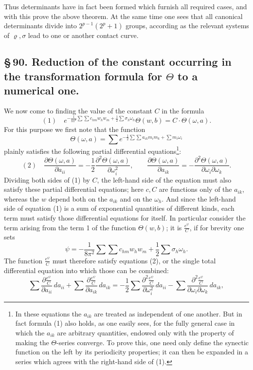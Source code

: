 \documentclass[10pt]{article}
\begin{document}
Thus determinants have in fact been formed which furnish all required cases, and with this prove the above theorem. At the same time one sees that all canonical determinants divide into \(2^{p-1}(2^p+1)\) groups, according as the relevant systems of \(\varrho,\sigma\) lead to one or another contact curve.

\subsection*{\S\,90. Reduction of the constant occurring in the transformation formula for \(\Theta\) to a numerical one.}

We now come to finding the value of the constant \(C\) in the formula
\[
(1)\quad
e^{-\frac{1}{8\pi^2}\sum\sum c_{hm}w_hw_m+\frac12\sum\sigma_h\omega_h}
\Theta(w,b)
=C\cdot\Theta(\omega,a).
\]
For this purpose we first note that the function
\[
\Theta(\omega,a)=\sum e^{-\frac12\sum\sum a_{ik}m_im_k+\sum m_i\omega_i}
\]
plainly satisfies the following partial differential equations\footnote{In these equations the \(a_{ik}\) are treated as independent of one another. But in fact formula (1) also holds, as one easily sees, for the fully general case in which the \(a_{ik}\) are arbitrary quantities, endowed only with the property of making the \(\Theta\)-series converge. To prove this, one need only define the synectic function on the left by its periodicity properties; it can then be expanded in a series which agrees with the right-hand side of (1).}:
\[
(2)\quad
\frac{\partial\Theta(\omega,a)}{\partial a_{ii}}
=-\frac12\frac{\partial^2\Theta(\omega,a)}{\partial\omega_i^2},
\qquad
\frac{\partial\Theta(\omega,a)}{\partial a_{ik}}
=-\frac{\partial^2\Theta(\omega,a)}{\partial\omega_i\partial\omega_k}.
\]
Dividing both sides of (1) by \(C\), the left-hand side of the equation must also satisfy these partial differential equations; here \(c,C\) are functions only of the \(a_{ik}\), whereas the \(w\) depend both on the \(a_{ik}\) and on the \(\omega_h\). And since the left-hand side of equation (1) is a sum of exponential quantities of different kinds, each term must satisfy those differential equations for itself. In particular consider the term arising from the term 1 of the function \(\Theta(w,b)\); it is \(\frac{e^\psi}{C}\), if for brevity one sets
\[
\psi=-\frac{1}{8\pi^2}\sum\sum c_{hm}w_hw_m+\frac12\sum\sigma_h\omega_h.
\]
The function \(\frac{e^\psi}{C}\) must therefore satisfy equations (2), or the single total differential equation into which those can be combined:
\[
\sum\frac{\partial\frac{e^\psi}{C}}{\partial a_{ii}}\,da_{ii}
+\sum\frac{\partial\frac{e^\psi}{C}}{\partial a_{ik}}\,da_{ik}
=
-\frac12\sum\frac{\partial^2\frac{e^\psi}{C}}{\partial\omega_i^2}\,da_{ii}
-\sum\frac{\partial^2\frac{e^\psi}{C}}{\partial\omega_i\partial\omega_k}\,da_{ik},
\]
\end{document}
